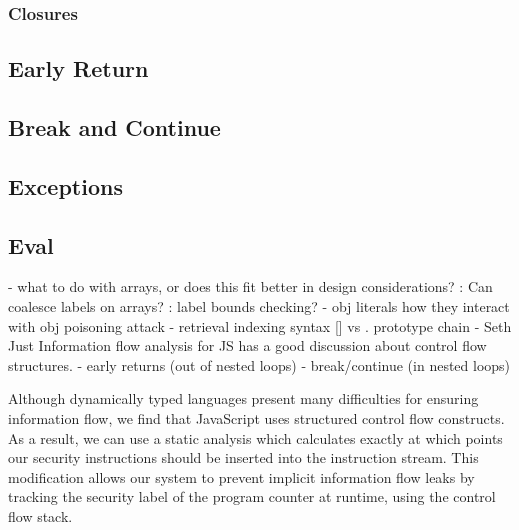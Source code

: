 \subsubsection{Closures}
\subsection{Early Return}
\subsection{Break and Continue}
\subsection{Exceptions}
\subsection{Eval}


 - what to do with arrays, or does this fit better in design considerations?
   : Can coalesce labels on arrays?
   : label bounds checking? 
 - obj literals
   how they interact with obj poisoning attack
 - retrieval
   indexing syntax [] vs .
   prototype chain
 - Seth Just Information flow analysis for JS has a good discussion about control flow structures.
 - early returns (out of nested loops)
 - break/continue (in nested loops)


Although dynamically typed languages present many difficulties for ensuring information flow, we find that JavaScript uses structured control flow constructs.
As a result, we can use a static analysis which calculates exactly at which points our security instructions should be inserted into the instruction stream.
This modification allows our system to prevent implicit information flow leaks by tracking the security label of the program counter at runtime, using the control flow stack.

